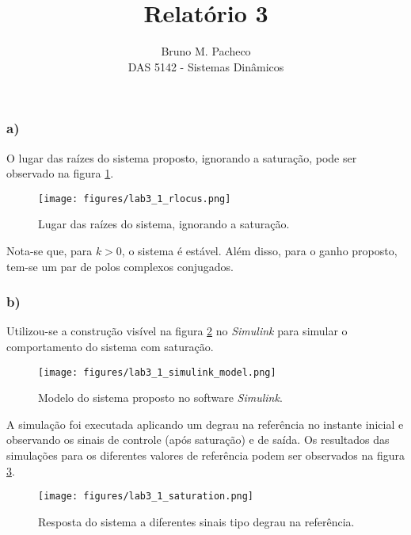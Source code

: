 \documentclass[a4paper]{report}
\begin{document}
 
\title{Relatório 3}
\author{Bruno M. Pacheco\\
DAS 5142 - Sistemas Dinâmicos}
 
\maketitle
 

\subsubsection*{a)}

O lugar das raízes do sistema proposto, ignorando a saturação, pode ser observado na figura \ref{fig:figures-lab3_1_rlocus-pdf}.

\begin{figure}[H]
    \centering
    \texttt{[image: figures/lab3\_1\_rlocus.png]}
    \caption{Lugar das raízes do sistema, ignorando a saturação.}
    \label{fig:figures-lab3_1_rlocus-pdf}
\end{figure}

Nota-se que, para $k>0$, o sistema é estável. Além disso, para o ganho proposto, tem-se um par de polos complexos conjugados.

\subsubsection*{b)}

Utilizou-se a construção visível na figura \ref{fig:figures-lab3_1_simulink_model-png} no \emph{Simulink} para simular o comportamento do sistema com saturação.

\begin{figure}[H]
    \centering
    \texttt{[image: figures/lab3\_1\_simulink\_model.png]}
    \caption{Modelo do sistema proposto no software \emph{Simulink}.}
    \label{fig:figures-lab3_1_simulink_model-png}
\end{figure}

A simulação foi executada aplicando um degrau na referência no instante inicial e observando os sinais de controle (após saturação) e de saída. Os resultados das simulações para os diferentes valores de referência podem ser observados na figura \ref{fig:figures-lab3_1_saturation-png}.

\begin{figure}[H]
    \centering
    \texttt{[image: figures/lab3\_1\_saturation.png]}
    \caption{Resposta do sistema a diferentes sinais tipo degrau na referência.}
    \label{fig:figures-lab3_1_saturation-png}
\end{figure}
\end{document}
